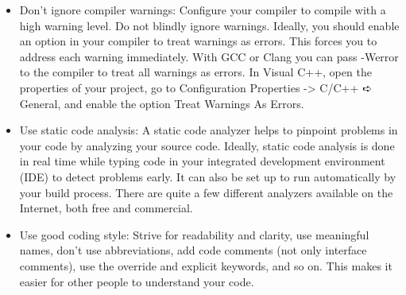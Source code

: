 \begin{itemize}
\item
Don’t ignore compiler warnings: Configure your compiler to compile with a high warning level. Do not blindly ignore warnings. Ideally, you should enable an option in your compiler to treat warnings as errors. This forces you to address each warning immediately. With GCC or Clang you can pass -Werror to the compiler to treat all warnings as errors. In Visual C++, open the properties of your project, go to Configuration Properties -> C/C++ ➪ General, and enable the option Treat Warnings As Errors.

\item
Use static code analysis: A static code analyzer helps to pinpoint problems in your code by analyzing your source code. Ideally, static code analysis is done in real time while typing code in your integrated development environment (IDE) to detect problems early. It can also be set up to run automatically by your build process. There are quite a few different analyzers available on the Internet, both free and commercial.

\item
Use good coding style: Strive for readability and clarity, use meaningful names, don’t use abbreviations, add code comments (not only interface comments), use the override and explicit keywords, and so on. This makes it easier for other people to understand your code.
\end{itemize}